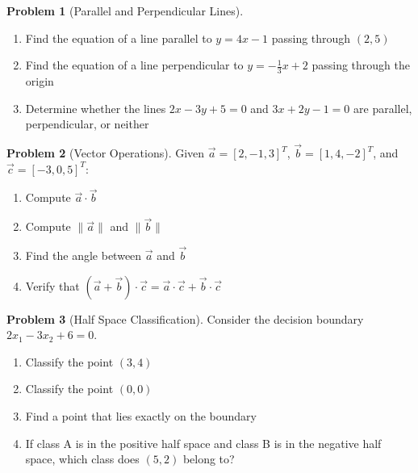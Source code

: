 \documentclass[12pt,a4paper]{article}
\theoremstyle{directpoint}
\theoremstyle{definition}
\newtheorem{problem}{Problem}[section]
\begin{document}
\begin{problem}[Parallel and Perpendicular Lines]
\begin{enumerate}[label=(\alph*)]
    \item Find the equation of a line parallel to $y = 4x - 1$ passing through $(2, 5)$
    \item Find the equation of a line perpendicular to $y = -\frac{1}{3}x + 2$ passing through the origin
    \item Determine whether the lines $2x - 3y + 5 = 0$ and $3x + 2y - 1 = 0$ are parallel, perpendicular, or neither
\end{enumerate}
\end{problem}

\begin{problem}[Vector Operations]
Given $\vec{a} = [2, -1, 3]^T$, $\vec{b} = [1, 4, -2]^T$, and $\vec{c} = [-3, 0, 5]^T$:
\begin{enumerate}[label=(\alph*)]
    \item Compute $\vec{a} \cdot \vec{b}$
    \item Compute $\|\vec{a}\|$ and $\|\vec{b}\|$
    \item Find the angle between $\vec{a}$ and $\vec{b}$
    \item Verify that $(\vec{a} + \vec{b}) \cdot \vec{c} = \vec{a} \cdot \vec{c} + \vec{b} \cdot \vec{c}$
\end{enumerate}
\end{problem}

\begin{problem}[Half Space Classification]
Consider the decision boundary $2x_1 - 3x_2 + 6 = 0$.
\begin{enumerate}[label=(\alph*)]
    \item Classify the point $(3, 4)$
    \item Classify the point $(0, 0)$
    \item Find a point that lies exactly on the boundary
    \item If class A is in the positive half space and class B is in the negative half space, which class does $(5, 2)$ belong to?
\end{enumerate}
\end{problem}
\end{document}
